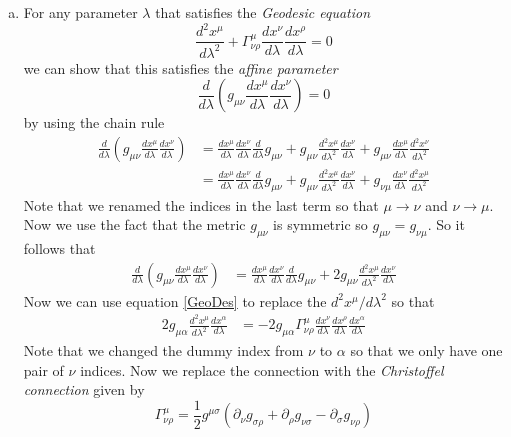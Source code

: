 \documentclass[11pt]{article}
\numberwithin{equation}{section}
\begin{document}
\begin{enumerate}[(a)]
\item
For any parameter $\lambda$ that satisfies the \emph{Geodesic equation}
\begin{equation}
\frac{d^2x^{\mu}}{d\lambda^2} + \Gamma^{\mu}_{\nu\rho}\frac{dx^{\nu}}{d\lambda}\frac{dx^{\rho}}{d\lambda} = 0
\label{GeoDes}
\end{equation}
we can show that this satisfies the \emph{affine parameter}
\begin{equation}
\frac{d}{d\lambda}\left(g_{\mu\nu}\frac{dx^{\mu}}{d\lambda}\frac{dx^{\nu}}{d\lambda}\right) = 0
\label{GeoDes}
\end{equation}
by using the chain rule
\begin{align*}
\frac{d}{d\lambda}\left(g_{\mu\nu}\frac{dx^{\mu}}{d\lambda}\frac{dx^{\nu}}{d\lambda}\right) &= \frac{dx^{\mu}}{d\lambda}\frac{dx^{\nu}}{d\lambda}\frac{d}{d\lambda}g_{\mu\nu} + g_{\mu\nu}\frac{d^2x^{\mu}}{d\lambda^2}\frac{dx^{\nu}}{d\lambda} + g_{\mu\nu}\frac{dx^{\mu}}{d\lambda}\frac{d^2x^{\nu}}{d\lambda^2}\\
&= \frac{dx^{\mu}}{d\lambda}\frac{dx^{\nu}}{d\lambda}\frac{d}{d\lambda}g_{\mu\nu} + g_{\mu\nu}\frac{d^2x^{\mu}}{d\lambda^2}\frac{dx^{\nu}}{d\lambda} + g_{\nu\mu}\frac{dx^{\nu}}{d\lambda}\frac{d^2x^{\mu}}{d\lambda^2}
\end{align*}
Note that we renamed the indices in the last term so that $\mu\rightarrow\nu$ and $\nu\rightarrow\mu$. Now we use the fact that the metric $g_{\mu\nu}$ is symmetric so $g_{\mu\nu} = g_{\nu\mu}$. So it follows that
\begin{align*}
\frac{d}{d\lambda}\left(g_{\mu\nu}\frac{dx^{\mu}}{d\lambda}\frac{dx^{\nu}}{d\lambda}\right) &= \frac{dx^{\mu}}{d\lambda}\frac{dx^{\nu}}{d\lambda}\frac{d}{d\lambda}g_{\mu\nu} + 2g_{\mu\nu}\frac{d^2x^{\mu}}{d\lambda^2}\frac{dx^{\nu}}{d\lambda} 
\end{align*}
Now we can use equation \ref{GeoDes} to replace the $d^2x^{\mu}/d\lambda^2$ so that
\begin{align*}
2g_{\mu\alpha}\frac{d^2x^{\mu}}{d\lambda^2}\frac{dx^{\alpha}}{d\lambda} &= -2g_{\mu\alpha}\Gamma^{\mu}_{\nu\rho}\frac{dx^{\nu}}{d\lambda}\frac{dx^{\rho}}{d\lambda}\frac{dx^{\alpha}}{d\lambda}
\end{align*}
Note that we changed the dummy index from $\nu$ to $\alpha$ so that we only have one pair of $\nu$ indices.  Now we replace the connection with the \emph{Christoffel connection} given by
$$\Gamma^{\mu}_{\nu\rho} = \frac{1}{2}g^{\mu\sigma}\left(\partial_{\nu}g_{\sigma\rho} + \partial_{\rho}g_{\nu\sigma} - \partial_{\sigma}g_{\nu\rho}\right)$$

\end{enumerate}
\end{document}
